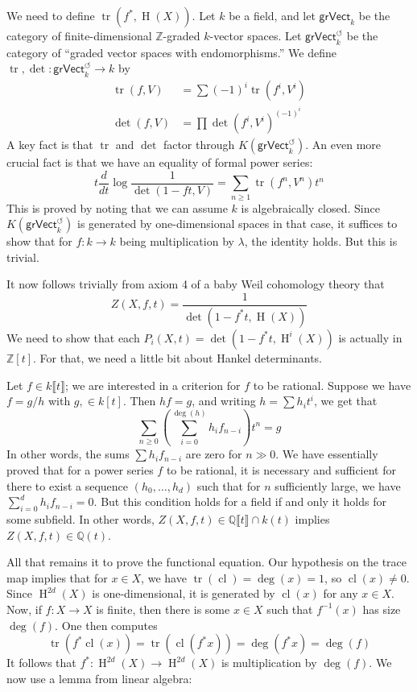 \documentclass{article}
\DeclareMathOperator{\h}{H}
\DeclareMathOperator{\tr}{tr}
\newcommand{\dZ}{\mathbb{Z}}
\begin{document}
We need to define $\tr(f^*,\h(X))$. Let $k$ be a field, and let 
$\mathsf{grVect}_k$ be the category of finite-dimensional $\dZ$-graded 
$k$-vector spaces. Let $\mathsf{grVect}_k^\circlearrowleft$ be the category of 
``graded vector spaces with endomorphisms.'' We define 
$\tr,\det:\mathsf{grVect}_k^\circlearrowleft\to k$ by 
\begin{align*}
  \tr(f,V) &= \sum (-1)^i \tr(f^i,V^i) \\
  \det(f,V) &= \prod \det(f^i,V^i)^{(-1)^i}
\end{align*}
A key fact is that $\tr$ and $\det$ factor through 
$K(\mathsf{grVect}_k^\circlearrowleft)$. An even more crucial fact is that 
we have an equality of formal power series:
\[
  t\frac{d}{dt}\log \frac{1}{\det(1-f t,V)} = \sum_{n\geqslant 1} \tr(f^n,V^n) t^n
\]
This is proved by noting that we can assume $k$ is algebraically closed. Since 
$K(\mathsf{grVect}_k^\circlearrowleft)$ is generated by one-dimensional spaces 
in that case, it suffices to show that for $f:k\to k$ being multiplication by 
$\lambda$, the identity holds. But this is trivial. 

It now follows trivially from axiom 4 of a baby Weil cohomology theory that 
\[
  Z(X,f,t) = \frac{1}{\det\left(1-f^* t,\h(X)\right)}
\]
We need to show that each $P_i(X,t) = \det(1-f^* t,\h^i(X))$ is actually in 
$\dZ[t]$. For that, we need a little bit about Hankel determinants. 

Let $f\in k\llbracket t\rrbracket$; we are interested in a criterion for $f$ 
to be rational. Suppose we have $f = g/h$ with $g,\in k[t]$. Then 
$h f = g$, and writing $h=\sum h_i t^i$, we get that 
\[
  \sum_{n\geqslant 0} \left(\sum_{i=0}^{\deg(h)} h_i f_{n-i} \right) t^n = g
\]
In other words, the sums $\sum h_i f_{n-i}$ are zero for $n\gg 0$. We have 
essentially proved that for a power series $f$ to be rational, it is necessary 
and sufficient for there to exist a sequence $(h_0,\dots,h_d)$ such that for 
$n$ sufficiently large, we have $\sum_{i=0}^d h_i f_{n-i} = 0$. But this 
condition holds for a field if and only it holds for some subfield. In other 
words, $Z(X,f,t)\in \mathbb{Q}\llbracket t\rrbracket\cap k(t)$ implies 
$Z(X,f,t) \in \mathbb{Q}(t)$. 

All that remains it to prove the functional equation. Our hypothesis on the 
trace map implies that for $x\in X$, we have 
$\tr(\operatorname{cl}) = \deg(x) = 1$, so $\operatorname{cl}(x)\ne 0$. Since 
$\h^{2 d}(X)$ is one-dimensional, it is generated by $\operatorname{cl}(x)$ 
for any $x\in X$. Now, if $f:X\to X$ is finite, then there is some $x\in X$ 
such that $f^{-1}(x)$ has size $\deg(f)$. One then computes 
\[
  \tr(f^*\operatorname{cl}(x)) = \tr(\operatorname{cl}(f^* x)) = \deg(f^* x) = \deg(f)
\]
It follows that $f^*:\h^{2 d}(X)\to \h^{2 d}(X)$ is multiplication by 
$\deg(f)$. We now use a lemma from linear algebra:
\end{document}
